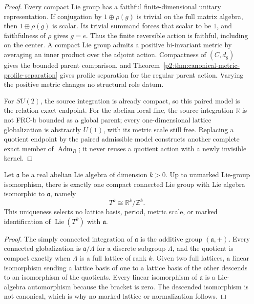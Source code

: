 \documentclass[12pt,a4paper]{article}
\begin{document}
\begin{proof}
Every compact Lie group has a faithful finite-dimensional unitary
representation.  If conjugation by \(1\oplus\rho(g)\) is trivial on the full
matrix algebra, then \(1\oplus\rho(g)\) is scalar.  Its trivial summand forces
that scalar to be \(1\), and faithfulness of \(\rho\) gives \(g=e\).  Thus
the finite reversible action is faithful, including on the center.  A compact
Lie group admits a positive bi-invariant metric by averaging an inner product
over the adjoint action.  Compactness of \((C,d_g)\) gives the bounded parent
comparison, and
Theorem~\ref{p2:thm:canonical-metric-profile-separation} gives profile
separation for the regular parent action.  Varying the positive metric changes
no structural role datum.

For \(SU(2)\), the source integration is already compact, so this paired
model is the relation-exact endpoint.  For the abelian local line, the source
integration \(\mathbb R\) is not FRC-b bounded as a global parent; every
one-dimensional lattice globalization is abstractly \(U(1)\), with its metric
scale still free.  Replacing a quotient endpoint by the paired admissible model
constructs another complete exact member of \(\operatorname{Adm}_R\); it never
reuses a quotient action with a newly invisible kernel.
\end{proof}

\begin{lemma}
\label{p2:lem:abelian-compact-globalization}
Let \(\mathfrak a\) be a real abelian Lie algebra of dimension \(k>0\).  Up to
unmarked Lie-group isomorphism, there is exactly one compact connected Lie
group with Lie algebra isomorphic to \(\mathfrak a\), namely
\[
 T^k\cong\mathbb R^k/\mathbb Z^k.
\]
This uniqueness selects no lattice basis, period, metric scale, or marked
identification of \(\operatorname{Lie}(T^k)\) with \(\mathfrak a\).
\end{lemma}

\begin{proof}
The simply connected integration of \(\mathfrak a\) is the additive group
\((\mathfrak a,+)\).  Every connected globalization is
\(\mathfrak a/\Lambda\) for a discrete subgroup \(\Lambda\), and the quotient
is compact exactly when \(\Lambda\) is a full lattice of rank \(k\).  Given
two full lattices, a linear isomorphism sending a lattice basis of one to a
lattice basis of the other descends to an isomorphism of the quotients.  Every
linear isomorphism of \(\mathfrak a\) is a Lie-algebra automorphism because the
bracket is zero.  The descended isomorphism is not canonical, which is why no
marked lattice or normalization follows.
\end{proof}
\end{document}

